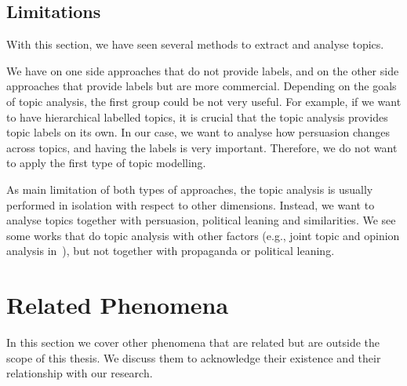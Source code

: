 


\subsection{\statusgreen Limitations}

With this section, we have seen several methods to extract and analyse topics.

We have on one side approaches that do not provide labels, and on the other side approaches that provide labels but are more commercial.
Depending on the goals of topic analysis, the first group could be not very useful. For example, if we want to have hierarchical labelled topics, it is crucial that the topic analysis provides topic labels on its own.
In our case, we want to analyse how persuasion changes across topics, and having the labels is very important. Therefore, we do not want to apply the first type of topic modelling.

As main limitation of both types of approaches, the topic analysis is usually performed in isolation with respect to other dimensions.
Instead, we want to analyse topics together with persuasion, political leaning and similarities.
We see some works that do topic analysis with other factors (e.g., joint topic and opinion analysis in~\cite{stoyanov2008topic}), but not together with propaganda or political leaning.

\section{\statusgreen Related Phenomena}
\label{sec:lit_related}

In this section we cover other phenomena that are related but are outside the scope of this thesis.
We discuss them to acknowledge their existence and their relationship with our research.


